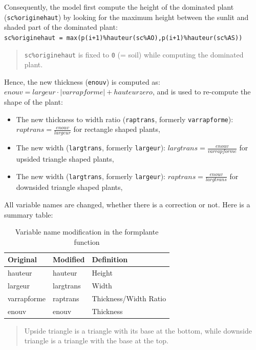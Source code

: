 \documentclass[]{book}
\providecommand{\tightlist}{%
  \setlength{\itemsep}{0pt}\setlength{\parskip}{0pt}}
\theoremstyle{definition}
\theoremstyle{definition}
\theoremstyle{definition}
\theoremstyle{remark}
\begin{document}
Consequently, the model first compute the height of the dominated plant
(\texttt{sc\%originehaut}) by looking for the maximum height between the
sunlit and shaded part of the dominated plant:\\
\texttt{sc\%originehaut\ =\ max(p(i+1)\%hauteur(sc\%AO),p(i+1)\%hauteur(sc\%AS))}

\begin{quote}
\texttt{sc\%originehaut} is fixed to \texttt{0} (= soil) while computing
the dominated plant.
\end{quote}

Hence, the new thickness (\texttt{enouv}) is computed as:
\(enouv=largeur\cdot\left|varrapforme\right|+hauteurzero\), and is used
to re-compute the shape of the plant:

\begin{itemize}
\tightlist
\item
  The new thickness to width ratio (\texttt{raptrans}, formerly
  \texttt{varrapforme}): \(raptrans=\frac{enouv}{largeur}\) for
  rectangle shaped plants,
\item
  The new width (\texttt{largtrans}, formerly \texttt{largeur}):
  \(largtrans=\frac{enouv}{varrapforme}\) for upsided triangle shaped
  plants,
\item
  The new width (\texttt{largtrans}, formerly \texttt{largeur}):
  \(raptrans=\frac{enouv}{largtrans}\) for downsided triangle shaped
  plants,
\end{itemize}

All variable names are changed, whether there is a correction or not.
Here is a summary table:

\begin{table}

\caption{\label{tab:varmatch}Variable name modification in the formplante function}
\centering
\begin{tabular}[t]{l|l|l}
\hline
Original & Modified & Definition\\
\hline
hauteur & hauteur & Height\\
\hline
largeur & largtrans & Width\\
\hline
varrapforme & raptrans & Thickness/Width Ratio\\
\hline
enouv & enouv & Thickness\\
\hline
\end{tabular}
\end{table}

\begin{quote}
Upside triangle is a triangle with its base at the bottom, while
downside triangle is a triangle with the base at the top.
\end{quote}
\end{document}
